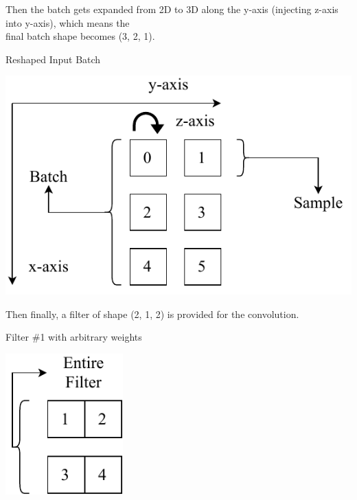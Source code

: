 \documentclass[a4paper, 12pt]{report}
\newcommand\tab[1][1cm]{\hspace*{#1}}
\begin{document}
\begin{tcbraster}[raster columns=2,raster rows=1,
	enhanced,size=small,fit algorithm=hybrid* ]
	\begin{tcolorbox}[frame hidden,colback=white]
		\tab Then the batch gets expanded from \tab 2D to 3D along the y-axis (injecting z-\tab axis into y-axis), which means the\\\tab final batch shape becomes (3, 2, 1).
	\end{tcolorbox}
	\begin{inlinefigure}{Reshaped Input Batch}
		\begin{center}
			\includegraphics[width=\textwidth]{input_reshaped}
		\end{center}
	\end{inlinefigure}
\end{tcbraster}
\begin{tcbraster}[raster columns=2,raster rows=1,
	enhanced,size=small,fit algorithm=hybrid* ]
	\begin{tcolorbox}[frame hidden,colback=white]
		\tab Then finally, a filter of shape (2, 1, 2) is \tab provided for the convolution.
	\end{tcolorbox}
	\begin{inlinefigure}{Filter \#1 with arbitrary weights}
		\begin{center}
			\includegraphics[width=0.34\textwidth]{filter1}
		\end{center}
	\end{inlinefigure}
\end{tcbraster}
\end{document}
